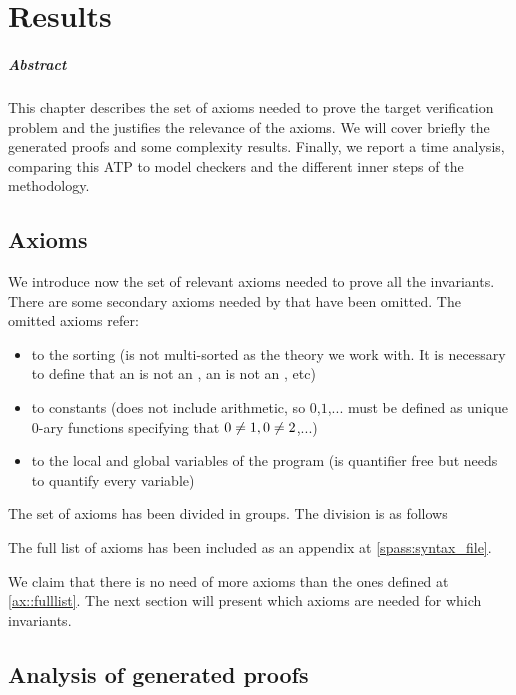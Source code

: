 \chapter{Results\label{chap:results}}

\paragraph{Abstract}

This chapter describes the set of axioms needed to prove the target verification problem and the justifies the relevance of the axioms.
%
We will cover briefly the generated proofs and some complexity results.
%
Finally, we report a time analysis, comparing this \gls{ATP} to model checkers and the different inner steps of the methodology.


\section{Axioms}

We introduce now the set of relevant axioms needed to prove all the invariants.
%
There are some secondary axioms needed by \spass that have been omitted. 
%
The omitted axioms refer: 
%
\begin{itemize}
	\item to the sorting (\spass is not multi-sorted as the theory we work with. It is necessary to define that an \addr is not an \elem, an \elem is not an \addr, etc)
	\item to constants (\spass does not include arithmetic, so $0$,$1$,... must be defined as unique 0-ary functions specifying that $0\not= 1,0\not= 2$,...)
	\item to the local and global variables of the program (\leap is quantifier free but \spass needs to quantify every variable)
\end{itemize}  
%
The set of axioms has been divided in groups. 
%
The division is as follows
		
\label{ax::fulllist}



The full list of axioms has been included as an appendix at \ref{spass:syntax_file}. 

%

We claim that there is no need of more axioms than the ones defined at \ref{ax::fulllist}. 
%
The next section will present which axioms are needed for which invariants.

\section{Analysis of generated proofs}
\label{proof:Preserve}
\label{sec:axiomgraph}

